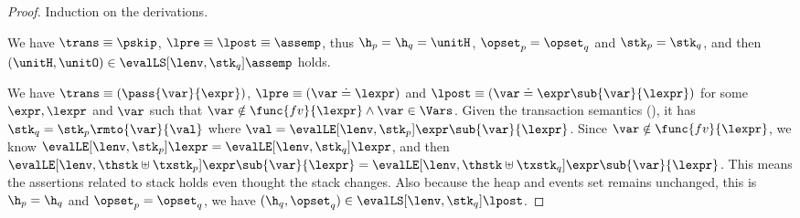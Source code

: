 \begin{proof}
Induction on the derivations.


We have  \(\trans \equiv \pskip\), \( \lpre \equiv \lpost \equiv \assemp \), thus \( \h_{p} = \h_{q} = \unitH \), \( \opset_{p} = \opset_{q} \) and \( \stk_{p} = \stk_{q} \), and then \( (\unitH,\unitO ) \in \evalLS[\lenv, \stk_{q}]{\assemp} \) holds.


We have \(\trans \equiv ( \pass{\var}{\expr} ) \), \( \lpre \equiv ( \var \doteq \lexpr ) \) and \( \lpost \equiv ( \var \doteq \expr\sub{\var}{\lexpr} ) \) for some \( \expr, \lexpr \) and \( \var \) such that \( \var \notin \func{fv}{\lexpr} \land \var \in \Vars\).
Given the transaction semantics (), it has \( \stk_{q} = \stk_{p}\rmto{\var}{\val} \) where \( \val = \evalLE[\lenv, \stk_{p}]{\expr\sub{\var}{\lexpr}} \).
Since \( \var \notin \func{fv}{\lexpr} \), we know \( \evalLE[\lenv, \stk_{p}]{\lexpr} = \evalLE[\lenv, \stk_{q}]{\lexpr} \), and then \( \evalLE[\lenv, \thstk \uplus \txstk_{p}]{\expr\sub{\var}{\lexpr}} = \evalLE[\lenv, \thstk \uplus \txstk_{q}]{\expr\sub{\var}{\lexpr}} \).
This means the assertions related to stack holds even thought the stack changes.
Also because the heap and events set remains unchanged, this is \( \h_{p} = \h_{q} \) and \( \opset_{p} = \opset_{q} \), we have \( (\h_{q}, \opset_{q} ) \in \evalLS[\lenv, \stk_{q}]{\lpost} \).



\end{proof}
